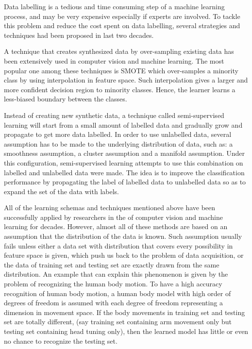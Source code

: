 \documentclass{iitthesis}
\begin{document}
 \label{sec: solution}

Data labelling is a tedious and time consuming step of a machine learning process, and may be very expensive especially if experts are involved. To tackle this problem and reduce the cost spent on data labelling, several strategies and techniques had been proposed in last two decades.

A technique that creates synthesized data by over-sampling existing data has been extensively used in computer vision and machine learning. The most popular one among these techniques is SMOTE \cite{CN:02} which over-samples a minority class by using interpolation in feature space. Such interpolation gives a larger and more confident decision region to minority classes. Hence, the learner learns a less-biased boundary between the classes.

Instead of creating new synthetic data, a technique called semi-supervised learning will start from a small amount of labelled data and gradually grow and propagate to get more data labelled. In order to use unlabelled data, several assumption has to be made to the underlying distribution of data, such as: a smoothness assumption, a cluster assumption and a manifold assumption\cite{CO:06}. Under this configuration, semi-supervised learning attempts to use this combination on labelled and unlabelled data were made. The idea is to improve the classification performance by propagating the label of labelled data to unlabelled data so as to expand the set of the data with labels.  

All of the learning schemas and techniques mentioned above have been successfully applied by researchers in the of computer vision and machine learning for decades. However, almost all of these methods are based on an assumption that the distribution of the data is known. Such assumption usually fails unless either a data set with distribution that covers every possibility in feature space is given, which push us back to the problem of data acquisition, or the data of training set and testing set are exactly drawn from the same distribution. An example that can explain this phenomenon is given by the problem of recognizing the human body motion. To have a high accuracy recognition of human body motion, a human body model with high order of degrees of freedom is assumed with each degree of freedom representing a dimension in movement space. If the body movements in training set and testing set are totally different, (say training set containing arm movement only but testing set containing head tuning only), then the learned model has little or even no chance to recognize the testing set. 
\end{document}
